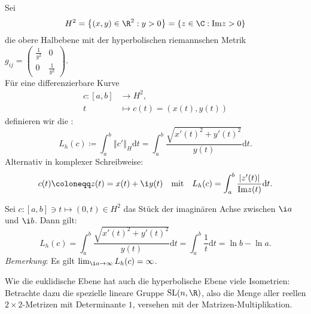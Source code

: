 \begin{definition}
  Sei
  \begin{equation*}
    H^2 = \left \{ (x,y) \in \R^2 : y > 0 \right \} = \left \{ z \in \C : \text{Im} z > 0 \right \}
  \end{equation*}
  die obere Halbebene mit der hyperbolischen riemannschen Metrik \( g_{ij} = \left( \begin{smallmatrix}
    \tfrac{1}{y^2} & 0 \\ 0 & \tfrac{1}{y^2}
  \end{smallmatrix} \right) \). \\
  Für eine differenzierbare Kurve 
  \begin{align*}
    c: [a,b] &\to H^2\text{,} \\
    t &\mapsto c(t) = (x(t),y(t))
  \end{align*}
  definieren wir die :
  \begin{equation*}
    L_h(c) \coloneqq \int_a^b \left\Vert c' \right\Vert_H \text{d}t = \int_a^b \frac{\sqrt{{x'(t)}^2 + {y'(t)}^2}}{y(t)}\text{d}t\text{.}
  \end{equation*}
  Alternativ in komplexer Schreibweise:
  \begin{equation*}
    c(t) \coloneqq z(t) = x(t) + \i y(t) \quad \text{mit} \quad L_h(c) = \int_a^b \frac{\left\vert z'(t) \right\vert}{\text{Im} z(t)}\text{d}t\text{.}
  \end{equation*}
\end{definition}

\begin{example}
  Sei \( c: [a,b] \ni t \mapsto (0,t) \in H^2 \) das Stück der imaginären Achse zwischen \( \i a \) und \( \i b \). Dann gilt:
  \begin{equation*}
    L_h(c) = \int_a^b \frac{\sqrt{{x'(t)}^2 + {y'(t)}^2}}{y(t)}\text{d}t = \int_a^b \frac{1}{t}\text{d}t = \ln b - \ln a\text{.}
  \end{equation*}
  \emph{Bemerkung}: Es gilt \( \lim_{\i a \to \infty}L_h(c) = \infty \).
\end{example}

Wie die euklidische Ebene hat auch die hyperbolische Ebene viele Isometrien: \\
Betrachte dazu die spezielle lineare Gruppe \( \text{SL}(n,\R) \), also die Menge aller reellen \( 2 \times 2 \)-Metrizen mit Determinante \( 1 \), versehen mit der Matrizen-Multiplikation. \\

